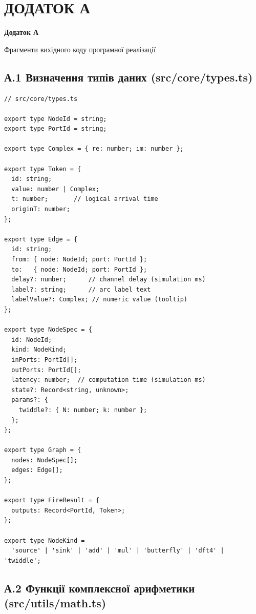 \section*{ДОДАТОК А}
{\centering\bfseries Додаток А\par}
{\centering Фрагменти вихідного коду програмної реалізації\par}
\vspace{1em}

\subsection*{А.1 Визначення типів даних (src/core/types.ts)}

\begin{lstlisting}[style=jsstyle,
  caption={Визначення типів даних симулятора},
  label={lst:types}]
// src/core/types.ts

export type NodeId = string;
export type PortId = string;

export type Complex = { re: number; im: number };

export type Token = {
  id: string;
  value: number | Complex;
  t: number;       // logical arrival time
  originT: number;
};

export type Edge = {
  id: string;
  from: { node: NodeId; port: PortId };
  to:   { node: NodeId; port: PortId };
  delay?: number;      // channel delay (simulation ms)
  label?: string;      // arc label text
  labelValue?: Complex; // numeric value (tooltip)
};

export type NodeSpec = {
  id: NodeId;
  kind: NodeKind;
  inPorts: PortId[];
  outPorts: PortId[];
  latency: number;  // computation time (simulation ms)
  state?: Record<string, unknown>;
  params?: {
    twiddle?: { N: number; k: number };
  };
};

export type Graph = {
  nodes: NodeSpec[];
  edges: Edge[];
};

export type FireResult = {
  outputs: Record<PortId, Token>;
};

export type NodeKind =
  'source' | 'sink' | 'add' | 'mul' | 'butterfly' | 'dft4' | 'twiddle';
\end{lstlisting}

\subsection*{А.2 Функції комплексної арифметики (src/utils/math.ts)}

